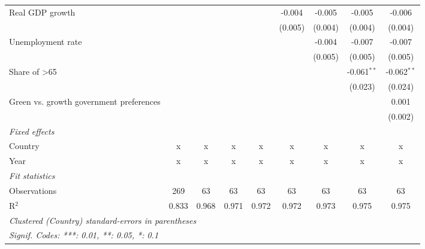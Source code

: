 \begin{table}[htbp]
\begin{tabular}{lcccccccc}
      Real GDP growth                                                  &         &         &              &               & -0.004        & -0.005       & -0.005        & -0.006\\   
                                                                       &         &         &              &               & (0.005)       & (0.004)      & (0.004)       & (0.004)\\   
      Unemployment rate                                                &         &         &              &               &               & -0.004       & -0.007        & -0.007\\   
                                                                       &         &         &              &               &               & (0.005)      & (0.005)       & (0.005)\\   
      Share of >65                                                     &         &         &              &               &               &              & -0.061$^{**}$ & -0.062$^{**}$\\   
                                                                       &         &         &              &               &               &              & (0.023)       & (0.024)\\   
      Green vs. growth government preferences                          &         &         &              &               &               &              &               & 0.001\\   
                                                                       &         &         &              &               &               &              &               & (0.002)\\   
      \emph{Fixed effects}\\
      Country                                                          & x       & x       & x            & x             & x             & x            & x             & x\\  
      Year                                                             & x       & x       & x            & x             & x             & x            & x             & x\\  
      \midrule \emph{Fit statistics}\\
      Observations                                                     & 269     & 63      & 63           & 63            & 63            & 63           & 63            & 63\\  
      R$^2$                                                            & 0.833   & 0.968   & 0.971        & 0.972         & 0.972         & 0.973        & 0.975         & 0.975\\  
      \midrule
      \multicolumn{9}{l}{\emph{Clustered (Country) standard-errors in parentheses}}\\
      \multicolumn{9}{l}{\emph{Signif. Codes: ***: 0.01, **: 0.05, *: 0.1}}\\
   \end{tabular}
\end{table}


